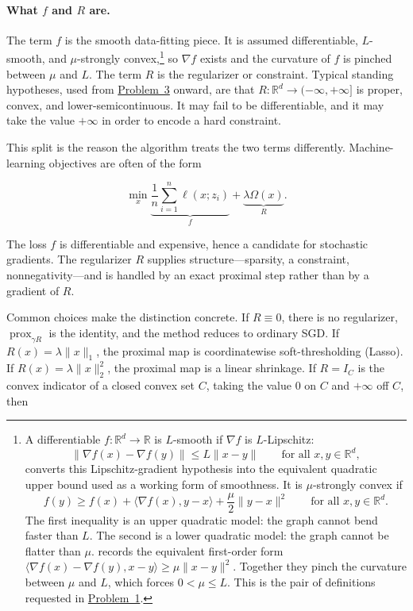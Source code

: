 \documentclass[11pt,a4paper]{article}
\DeclareMathOperator{\prox}{prox}
\newcommand{\jump}[2]{\hyperref[#1]{#2}}
\theoremstyle{definition}
\begin{document}
\paragraph{What $f$ and $R$ are.}
The term $f$ is the smooth data-fitting piece. It is assumed differentiable, $L$-smooth, and $\mu$-strongly convex,\footnote{A differentiable $f:\mathbb{R}^d\to\mathbb{R}$ is $L$-smooth if $\nabla f$ is $L$-Lipschitz:
\[
\|\nabla f(x)-\nabla f(y)\|\leq L\|x-y\|
\qquad\text{for all }x,y\in\mathbb{R}^d,
\]
 converts this Lipschitz-gradient hypothesis into the equivalent quadratic upper bound used as a working form of smoothness.
It is $\mu$-strongly convex if
\[
f(y)\geq f(x)+\langle\nabla f(x),y-x\rangle+\frac{\mu}{2}\|y-x\|^2
\qquad\text{for all }x,y\in\mathbb{R}^d.
\]
The first inequality is an upper quadratic model: the graph cannot bend faster than $L$. The second is a lower quadratic model: the graph cannot be flatter than $\mu$.  records the equivalent first-order form $\langle\nabla f(x)-\nabla f(y),x-y\rangle\geq\mu\|x-y\|^2$. Together they pinch the curvature between $\mu$ and $L$, which forces $0<\mu\leq L$. This is the pair of definitions requested in \jump{prob:spr2025-opt-1}{Problem~1}.} so $\nabla f$ exists and the curvature of $f$ is pinched between $\mu$ and $L$. The term $R$ is the regularizer or constraint. Typical standing hypotheses, used from \jump{prob:spr2025-opt-3}{Problem~3} onward, are that $R:\mathbb{R}^d\to(-\infty,+\infty]$ is proper, convex, and lower-semicontinuous. It may fail to be differentiable, and it may take the value $+\infty$ in order to encode a hard constraint.

This split is the reason the algorithm treats the two terms differently. Machine-learning objectives are often of the form

\[
\min_x
\underbrace{\frac{1}{n}\sum_{i=1}^n \ell(x;z_i)}_{f}
+
\underbrace{\lambda\Omega(x)}_{R}.
\]

The loss $f$ is differentiable and expensive, hence a candidate for stochastic gradients. The regularizer $R$ supplies structure---sparsity, a constraint, nonnegativity---and is handled by an exact proximal step rather than by a gradient of $R$.

Common choices make the distinction concrete. If $R\equiv 0$, there is no regularizer, $\prox_{\gamma R}$ is the identity, and the method reduces to ordinary SGD. If $R(x)=\lambda\|x\|_1$, the proximal map is coordinatewise soft-thresholding (Lasso). If $R(x)=\lambda\|x\|_2^2$, the proximal map is a linear shrinkage. If $R=I_C$ is the convex indicator of a closed convex set $C$, taking the value $0$ on $C$ and $+\infty$ off $C$, then
\end{document}

